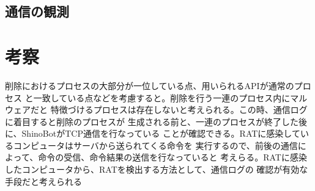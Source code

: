 \documentclass[dvipdfmx,autodetect-engine]{jsarticle}
\begin{document}
\subsection{通信の観測}

\begin{figure}[H]
  \centering
  \caption{}
\end{figure}

\section{考察}
削除におけるプロセスの大部分が一位している点、用いられるAPIが通常のプロセス
と一致している点などを考慮すると。削除を行う一連のプロセス内にマルウェアだと
特徴づけるプロセスは存在しないと考えられる。この時、通信ログに着目すると削除のプロセスが
生成される前と、一連のプロセスが終了した後に、ShinoBotがTCP通信を行なっている
ことが確認できる。RATに感染しているコンピュータはサーバから送られてくる命令を
実行するので、前後の通信によって、命令の受信、命令結果の送信を行なっていると
考えらる。RATに感染したコンピュータから、RATを検出する方法として、通信ログの
確認が有効な手段だと考えられる
\end{document}
